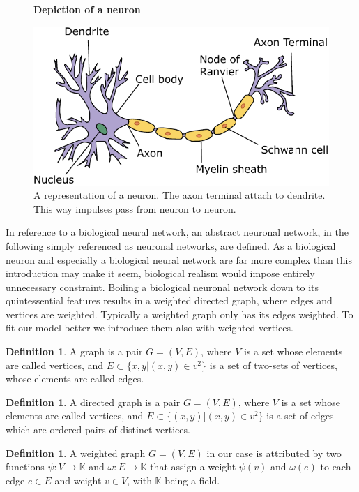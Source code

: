 \documentclass{article}
\theoremstyle{definition}
\newtheorem{definition}[theorem]{Definition}
\newcommand*{\figuretitle}[1]{%
    {\centering%
    \textbf{#1}%
    \par\medskip}%
}
\begin{document}
\begin{figure}[H]
\centering
\figuretitle{Depiction of a neuron}
\includegraphics[scale=0.75]{graphics/neuron.pdf}
\caption{A representation of a neuron. The axon terminal attach to dendrite. This way impulses pass from neuron to neuron.}
\label{fig:neuron}
\end{figure}

In reference to a biological neural network, an abstract neuronal network, in the following simply referenced as neuronal networks, are defined. As a biological neuron and especially a biological neural network are far more complex than this introduction may make it seem, biological realism would impose entirely unnecessary constraint. Boiling a biological neuronal network down to its quintessential features results in a weighted directed graph, where edges and vertices are weighted. Typically a weighted graph only has its edges weighted. To fit our model better we introduce them also with weighted vertices.

\begin{definition}
A graph is a pair $G = (V, E)$, where $V$ is a set whose elements are called vertices, and $E \subset \{ {x, y}|(x,y) \in v^{2} \}$ is a set of two-sets of vertices, whose elements are called edges.
\end{definition}

\begin{definition}
A directed graph is a pair $G = (V, E)$, where $V$ is a set whose elements are called vertices, and $E \subset \{ (x, y)|(x,y) \in v^{2} \}$ is a set of edges which are ordered pairs of distinct vertices.
\end{definition}

\begin{definition}
A weighted graph $G = (V, E)$ in our case is attributed by two functions $\psi : V \to \mathbb{K}$ and $\omega : E \to \mathbb{K}$ that assign a weight $\psi(v)$ and $\omega(e)$ to each edge $e \in E$ and weight $v \in V$, with $\mathbb{K}$ being a field.
\end{definition}
\end{document}
